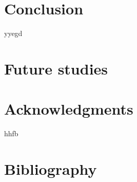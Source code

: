 \documentclass[12pt,a4paper]{article}
\begin{document}
\newpage
\section{Conclusion}

yyegd

\newpage
\section{Future studies}
\newpage
\section{Acknowledgments}
hhfb




\newpage
\section{Bibliography}
\end{document}
